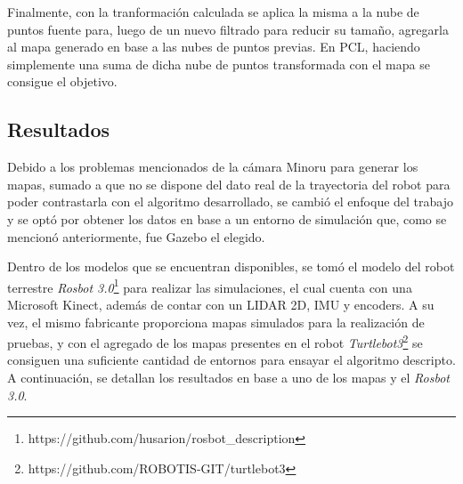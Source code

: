 Finalmente, con la tranformación calculada se aplica la misma a la nube de puntos fuente para, luego de un nuevo filtrado para reducir su tamaño, agregarla al mapa generado en base a las nubes de puntos previas. En PCL, haciendo simplemente una suma de dicha nube de puntos transformada con el mapa se consigue el objetivo.

\subsection{Resultados}
Debido a los problemas mencionados de la cámara Minoru para generar los mapas, sumado a que no se dispone del dato real de la trayectoria del robot para poder contrastarla con el algoritmo desarrollado, se cambió el enfoque del trabajo y se optó por obtener los datos en base a un entorno de simulación que, como se mencionó anteriormente, fue Gazebo el elegido. 

Dentro de los modelos que se encuentran disponibles, se tomó el modelo del robot terrestre  \textit{Rosbot 3.0}\footnote{https://github.com/husarion/rosbot\_description} para realizar las simulaciones, el cual cuenta con una Microsoft Kinect, además de contar con un LIDAR 2D, IMU y encoders. A su vez, el mismo fabricante proporciona mapas simulados para la realización de pruebas, y con el agregado de los mapas presentes en el robot \textit{Turtlebot3}\footnote{https://github.com/ROBOTIS-GIT/turtlebot3} se consiguen una suficiente cantidad de entornos para ensayar el algoritmo descripto. A continuación, se detallan los resultados en base a uno de los mapas y el \textit{Rosbot 3.0}.

